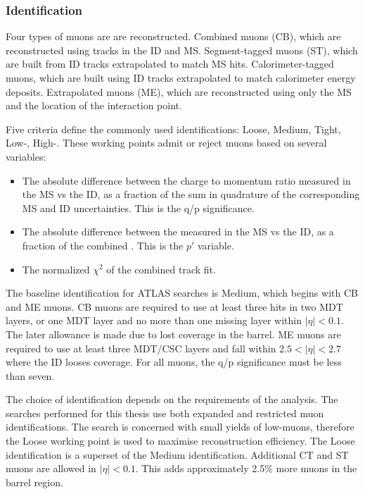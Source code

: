 \subsubsection{Identification}

Four types of muons are are reconstructed.
Combined muons (CB), which are reconstructed using tracks in the ID and MS.
Segment-tagged muons (ST), which are built from ID tracks extrapolated to match MS hits.
Calorimeter-tagged muons, which are built using ID tracks extrapolated to match calorimeter energy deposits.
Extrapolated muons (ME), which are reconstructed using only the MS and the location of the interaction point.

Five criteria define the commonly used identifications: Loose, Medium, Tight, Low-\pt, High-\pt.
These working points admit or reject muons based on several variables:
\begin{itemize}
    \item The absolute difference between the charge to momentum ratio measured in the MS vs the ID, as a fraction of the sum in quadrature of the corresponding MS and ID uncertainties. This is the q/p significance.
    \item The absolute difference between the \pt measured in the MS vs the ID, as a fraction of the combined \pt. This is the $p'$ variable.
    \item The normalized $\chi^2$ of the combined track fit.
\end{itemize}
The baseline identification for ATLAS searches is Medium, which begins with CB and ME muons.
CB muons are required to use at least three hits in two MDT layers, or one MDT layer and no more than one missing layer within $|\eta|<0.1$.
The later allowance is made due to lost coverage in the barrel.
ME muons are required to use at least three MDT/CSC layers and fall within $2.5<|\eta|<2.7$ where the ID looses coverage.
For all muons, the q/p significance must be less than seven.
\cite{muonReco}

The choice of identification depends on the requirements of the analysis.
The searches performed for this thesis use both expanded and restricted muon identifications.
The \hmm search is concerned with small yields of low-\pt muons, therefore the Loose working point is used to maximise reconstruction efficiency.
The Loose identification is a superset of the Medium identification.
Additional CT and ST muons are allowed in $|\eta|<0.1$. This adds approximately 2.5\% more muons in the barrel region.
\cite{muonReco}

